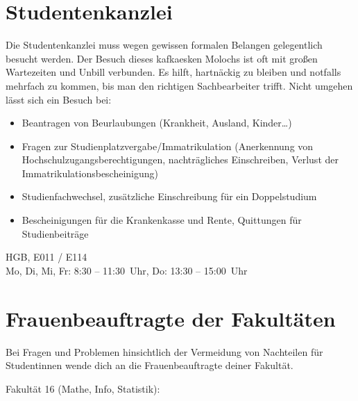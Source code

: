 \section{Studentenkanzlei}

Die Studentenkanzlei muss wegen gewissen formalen Belangen
gelegentlich besucht werden. Der Besuch dieses kafkaesken Molochs ist
oft mit großen Wartezeiten und Unbill verbunden. Es hilft, hartnäckig
zu bleiben und notfalls mehrfach zu kommen, bis man den richtigen
Sachbearbeiter trifft. Nicht umgehen lässt sich ein Besuch bei:

\begin{itemize}
\item Beantragen von Beurlaubungen (Krankheit, Ausland, Kinder\ldots)
\item Fragen zur Studienplatzvergabe/Immatrikulation (Anerkennung von Hochschulzugangsberechtigungen, nachträgliches Einschreiben, Verlust der Immatrikulationsbescheinigung)
\item Studienfachwechsel, zusätzliche Einschreibung für ein Doppelstudium
\item Bescheinigungen für die Krankenkasse und Rente, Quittungen für Studienbeiträge
\end{itemize}

HGB, E011 / E114\\
Mo, Di, Mi, Fr: 8:30 -- 11:30~Uhr, Do: 13:30 -- 15:00~Uhr\\
\begin{urlList}
\end{urlList}

%

\section{Frauenbeauftragte der Fakultäten}
Bei Fragen und Problemen hinsichtlich der Vermeidung von Nachteilen für Studentinnen
wende dich an die Frauenbeauftragte deiner Fakultät.

Fakultät 16 (Mathe, Info, Statistik): \newline
\begin{urlList}
	\\
\end{urlList}

